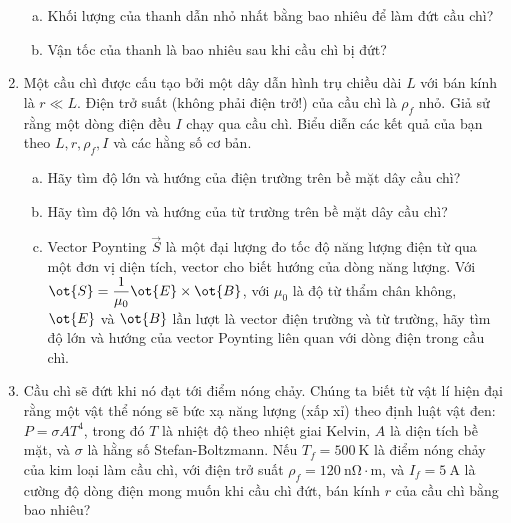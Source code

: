 \begin{vd}
\begin{enumerate}[1.]
\begin{center}
\begin{tikzpicture}[x=0.75pt,y=0.75pt,yscale=-1,xscale=1]
\end{tikzpicture}

    \end{center}
    \begin{enumerate}[a)]
        \item Khối lượng của thanh dẫn nhỏ nhất bằng bao nhiêu để làm đứt cầu chì?
        \item Vận tốc của thanh là bao nhiêu sau khi cầu chì bị đứt?
    \end{enumerate}
    \item Một cầu chì được cấu tạo bởi một dây dẫn hình trụ chiều dài $L$ với bán kính là $r\ll L$. Điện trở suất (không phải điện trở!) của cầu chì là $\rho_f$ nhỏ. Giả sử rằng một dòng điện đều $I$ chạy qua cầu chì. Biểu diễn các kết quả của bạn theo $L, r, \rho_f, I$ và các hằng số cơ bản.
    \begin{enumerate}[a)]
        \item Hãy tìm độ lớn và hướng của điện trường trên bề mặt dây cầu chì?
        \item Hãy tìm độ lớn và hướng của từ trường trên bề mặt dây cầu chì?
        \item Vector Poynting $\overrightarrow{S}$ là một đại lượng đo tốc độ năng lượng điện từ qua một đơn vị diện tích, vector cho biết hướng của dòng năng lượng. Với $\ot{S}=\dfrac{1}{\mu_0}\ot{E}\times\ot{B}$, với $\mu_0$ là độ từ thẩm chân không, $\ot{E}$ và $\ot{B}$ lần lượt là vector điện trường và từ trường, hãy tìm độ lớn và hướng của vector Poynting liên quan với dòng điện trong cầu chì.
    \end{enumerate}
    \item Cầu chì sẽ đứt khi nó đạt tới điểm nóng chảy. Chúng ta biết từ vật lí hiện đại rằng một vật thể nóng sẽ bức xạ năng lượng (xấp xỉ) theo định luật vật đen: $P=\sigma A T^4$, trong đó $T$ là nhiệt độ theo nhiệt giai Kelvin, $A$ là diện tích bề mặt, và $\sigma$ là hằng số Stefan-Boltzmann. Nếu $T_f=500\ \mathrm{K}$ là điểm nóng chảy của kim loại làm cầu chì, với điện trở suất $\rho_f=120\ \mathrm{n\Omega\cdot m}$, và $I_f=5\ \mathrm{A}$ là cường độ dòng điện mong muốn khi cầu chì đứt, bán kính $r$ của cầu chì bằng bao nhiêu?
    \end{enumerate}
\end{vd}
